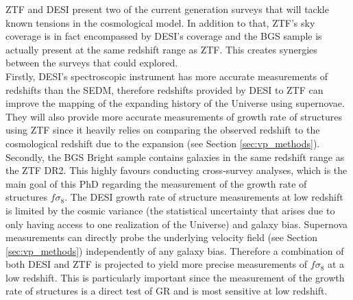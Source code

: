 ZTF and DESI present two of the current generation surveys that will tackle known tensions in the cosmological model. In addition to that, ZTF's sky coverage is in fact encompassed 
by DESI's coverage and the BGS sample is actually present at the same redshift range as ZTF. This creates synergies between the surveys that could explored.\\ 
Firstly, DESI's spectroscopic instrument has more accurate measurements of redshifts than the SEDM, therefore redshifts provided by DESI to ZTF can improve 
the mapping of the expanding history of the Universe using supernovae. They will also provide more accurate measurements of growth rate of structures 
using ZTF since it heavily relies on comparing the observed redshift to the cosmological redshift due to the expansion (see Section \ref{sec:vp_methods}). \\ 
Secondly, the BGS Bright sample contains galaxies in the same redshift range as the ZTF DR2. This highly favours conducting cross-survey analyses, which is the main 
goal of this PhD regarding the measurement of the growth rate of structures $f\sigma_8$. The DESI growth rate of structure measurements at low redshift is limited by the cosmic 
variance (the statistical uncertainty that arises due to only having access to one realization of the Universe) and galaxy bias. Supernova measurements can directly probe 
the underlying velocity field (see Section \ref{sec:vp_methods}) independently of any galaxy bias. Therefore a combination of both DESI and ZTF is projected to yield more 
precise measurements of $f\sigma_8$ at a low redshift. This is particularly important since the measurement of the growth rate of structures is a direct test of GR and is most 
sensitive at low redshift. \\
